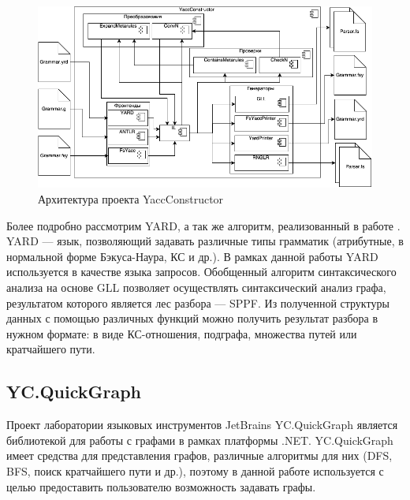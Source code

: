 \documentclass{spisok-article}
\begin{document}
        \begin{figure}
            \centering
            \includegraphics[width=\textwidth]{pictures/YCArch.png}
            \caption{Архитектура проекта YaccConstructor}
            \label{arch_yc}
        \end{figure}
	    
    Более подробно рассмотрим YARD, а так же алгоритм, реализованный в работе \cite{rag}. YARD --- язык, позволяющий задавать различные типы грамматик (атрибутные, в нормальной форме Бэкуса-Наура, КС и др.). В рамках данной работы YARD используется в качестве языка запросов. 
    Обобщенный алгоритм синтаксического анализа на основе GLL позволяет осуществлять синтаксический анализ графа, результатом которого является лес разбора --- SPPF. Из полученной структуры данных с помощью различных функций можно получить результат разбора в нужном формате: в виде КС-отношения, подграфа, множества путей или кратчайшего пути.
    
    \subsection*{YC.QuickGraph}
	    Проект лаборатории языковых инструментов JetBrains YC.QuickGraph является библиотекой для работы с графами в рамках платформы .NET. YC.QuickGraph имеет средства для представления графов, различные алгоритмы для них (DFS, BFS, поиск кратчайшего пути и др.), поэтому в данной работе используется с целью предоставить пользователю возможность задавать графы.
	
\end{document}

